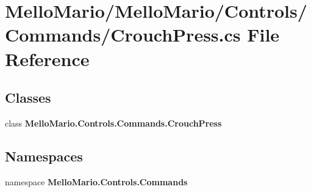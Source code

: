 \section{Mello\+Mario/\+Mello\+Mario/\+Controls/\+Commands/\+Crouch\+Press.cs File Reference}
\label{CrouchPress_8cs}
\subsection*{Classes}
\begin{DoxyCompactItemize}
\item 
class \textbf{ Mello\+Mario.\+Controls.\+Commands.\+Crouch\+Press}
\end{DoxyCompactItemize}
\subsection*{Namespaces}
\begin{DoxyCompactItemize}
\item 
namespace \textbf{ Mello\+Mario.\+Controls.\+Commands}
\end{DoxyCompactItemize}
